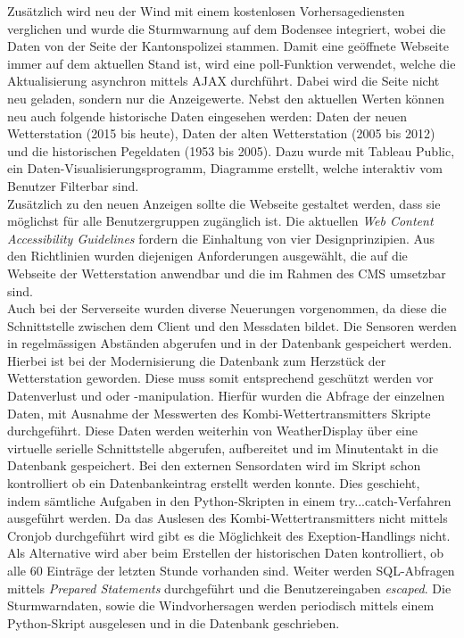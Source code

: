 \documentclass[10pt]{article}
\begin{document}
\begin{multicols}{2}
Zusätzlich wird neu der Wind mit einem kostenlosen Vorhersagediensten verglichen und wurde die Sturmwarnung auf dem Bodensee integriert, wobei die Daten von der Seite der Kantonspolizei stammen. Damit eine geöffnete Webseite immer auf dem aktuellen Stand ist, wird eine poll-Funktion verwendet, welche die Aktualisierung asynchron mittels AJAX durchführt. Dabei wird die Seite nicht neu geladen, sondern nur die Anzeigewerte. Nebst den aktuellen Werten können neu auch folgende historische Daten eingesehen werden: Daten der neuen Wetterstation (2015 bis heute), Daten der alten Wetterstation (2005 bis 2012) und die historischen Pegeldaten (1953 bis 2005). Dazu wurde mit Tableau Public, ein Daten-Visualisierungsprogramm, Diagramme erstellt, welche interaktiv vom Benutzer Filterbar sind.\\ 
Zusätzlich zu den neuen Anzeigen sollte die Webseite gestaltet werden, dass sie möglichst für alle Benutzergruppen zugänglich ist. Die aktuellen \emph{Web Content Accessibility Guidelines} fordern die Einhaltung von vier Designprinzipien. Aus den Richtlinien wurden diejenigen Anforderungen ausgewählt, die auf die Webseite der Wetterstation anwendbar und die im Rahmen des CMS umsetzbar sind. \\
Auch bei der  Serverseite wurden diverse Neuerungen vorgenommen, da diese die Schnittstelle zwischen dem Client und den Messdaten bildet. Die Sensoren werden in regelmässigen Abständen abgerufen und in der Datenbank gespeichert werden. Hierbei ist bei der Modernisierung die Datenbank zum Herzstück der Wetterstation geworden. Diese muss somit entsprechend geschützt werden vor Datenverlust und oder -manipulation. Hierfür wurden die Abfrage der einzelnen Daten, mit Ausnahme der Messwerten des Kombi-Wettertransmitters Skripte durchgeführt. Diese Daten werden weiterhin von WeatherDisplay über eine virtuelle serielle Schnittstelle abgerufen, aufbereitet und im Minutentakt in die Datenbank gespeichert. Bei den externen Sensordaten wird im Skript schon kontrolliert ob ein Datenbankeintrag erstellt werden konnte. Dies geschieht, indem sämtliche Aufgaben in den Python-Skripten in einem try...catch-Verfahren ausgeführt werden. Da das Auslesen des Kombi-Wettertransmitters nicht mittels Cronjob durchgeführt wird gibt es die Möglichkeit des Exeption-Handlings nicht. Als Alternative wird aber beim Erstellen der historischen Daten kontrolliert, ob alle 60 Einträge der letzten Stunde vorhanden sind. Weiter werden SQL-Abfragen mittels \emph{Prepared Statements} durchgeführt und die Benutzereingaben \emph{escaped}. Die Sturmwarndaten, sowie die Windvorhersagen werden periodisch mittels einem Python-Skript ausgelesen und in die Datenbank geschrieben.\\

\end{multicols}
\end{document}
